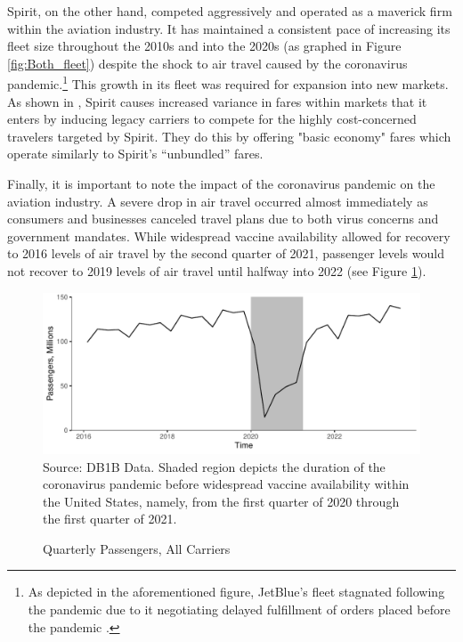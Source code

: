 \documentclass{article}
\begin{document}
	Spirit, on the other hand, competed aggressively and operated as  a maverick firm within the aviation industry. It has maintained a consistent pace of increasing its fleet size throughout the 2010s and into the 2020s (as graphed in Figure \ref{fig:Both_fleet}) despite the shock to air travel caused by the coronavirus pandemic.\footnote{As depicted in the aforementioned figure, JetBlue's fleet stagnated following the pandemic due to it negotiating delayed fulfillment of orders placed before the pandemic \citep{bellamy_iii_jetblue_2020, sipinski_jetblue_2020}.} This growth in its fleet was required for expansion into new markets. As shown in \citet{shrago_spirit_2024}, Spirit causes increased variance in fares within markets that it enters by inducing legacy carriers to compete for the highly cost-concerned travelers targeted by Spirit. They do this by offering "basic economy" fares which operate similarly to Spirit's ``unbundled'' fares.
	
	Finally, it is important to note the impact of the coronavirus pandemic on the aviation industry.  A severe drop in air travel occurred almost immediately as consumers and businesses canceled travel plans due to both virus concerns and government mandates. While widespread vaccine availability allowed for recovery to 2016 levels of air travel by the second quarter of 2021, passenger levels would not recover to 2019 levels of air travel until halfway into 2022 (see Figure \ref{fig:QuarterlyPass}). 

\begin{figure}
	\caption{Quarterly Passengers, All Carriers}
	\label{fig:QuarterlyPass}
	\includegraphics[width = \linewidth]{Quarterly_DB1B_Itineraries}
	\footnotesize{Source: DB1B Data. Shaded region depicts the duration of the coronavirus pandemic before widespread vaccine availability within the United States, namely, from the first quarter of 2020 through the first quarter of 2021.}
\end{figure}
    
\end{document}
